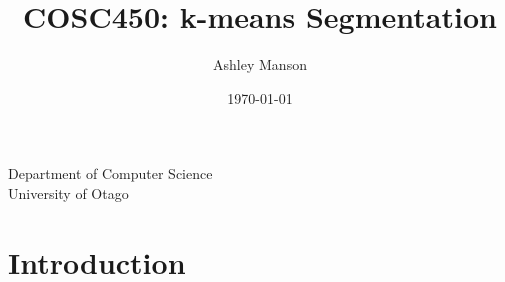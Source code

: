 \documentclass{article}
\begin{document}
\title{COSC450: k-means Segmentation}
\author{Ashley Manson}
\date{\today}

\begin{titlepage}
\clearpage
\maketitle
\thispagestyle{empty} %

\begin{center}

\vspace*{1\baselineskip} %

Department of Computer Science\\
University of Otago

\end{center}

\end{titlepage}


\section{Introduction}


\end{document}

